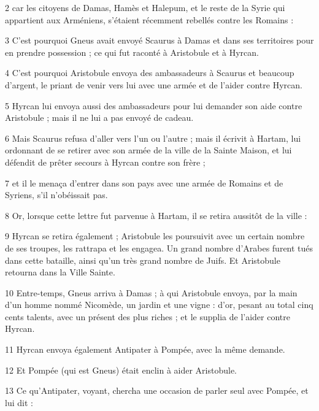 \par 2 car les citoyens de Damas, Hamès et Halepum, et le reste de la Syrie qui appartient aux Arméniens, s'étaient récemment rebellés contre les Romains :

\par 3 C'est pourquoi Gneus avait envoyé Scaurus à Damas et dans ses territoires pour en prendre possession ; ce qui fut raconté à Aristobule et à Hyrcan.

\par 4 C'est pourquoi Aristobule envoya des ambassadeurs à Scaurus et beaucoup d'argent, le priant de venir vers lui avec une armée et de l'aider contre Hyrcan.

\par 5 Hyrcan lui envoya aussi des ambassadeurs pour lui demander son aide contre Aristobule ; mais il ne lui a pas envoyé de cadeau.

\par 6 Mais Scaurus refusa d'aller vers l'un ou l'autre ; mais il écrivit à Hartam, lui ordonnant de se retirer avec son armée de la ville de la Sainte Maison, et lui défendit de prêter secours à Hyrcan contre son frère ;

\par 7 et il le menaça d'entrer dans son pays avec une armée de Romains et de Syriens, s'il n'obéissait pas.

\par 8 Or, lorsque cette lettre fut parvenue à Hartam, il se retira aussitôt de la ville :

\par 9 Hyrcan se retira également ; Aristobule les poursuivit avec un certain nombre de ses troupes, les rattrapa et les engagea. Un grand nombre d'Arabes furent tués dans cette bataille, ainsi qu'un très grand nombre de Juifs. Et Aristobule retourna dans la Ville Sainte.

\par 10 Entre-temps, Gneus arriva à Damas ; à qui Aristobule envoya, par la main d'un homme nommé Nicomède, un jardin et une vigne : d'or, pesant au total cinq cents talents, avec un présent des plus riches ; et le supplia de l'aider contre Hyrcan.

\par 11 Hyrcan envoya également Antipater à Pompée, avec la même demande.

\par 12 Et Pompée (qui est Gneus) était enclin à aider Aristobule.

\par 13 Ce qu'Antipater, voyant, chercha une occasion de parler seul avec Pompée, et lui dit :

